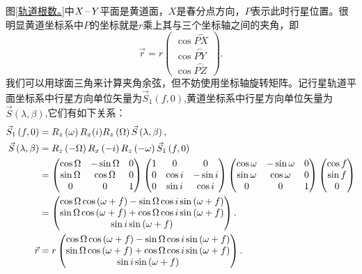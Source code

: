 \documentclass[11pt, a4paper, oneside]{ctexart}
\numberwithin{equation}{subsection}
\begin{document}
图\ref{轨道根数。}中$X\,\text{\textendash}\,Y$平面是黄道面，$X$是春分点方向，$P$表示此时行星位置。很明显黄道坐标系中$P$的坐标就是$r$乘上其与三个坐标轴之间的夹角，即
\begin{equation}
\vec{r}=r\begin{pmatrix}
\cos\overset{\frown}{PX}\\
\cos\overset{\frown}{PY}\\
\cos\overset{\frown}{PZ}
\end{pmatrix}.
\end{equation}
我们可以用球面三角来计算夹角余弦，但不妨使用坐标轴旋转矩阵。记行星轨道平面坐标系中行星方向单位矢量为$\vec{S}_{1}\left(f,0\right)$,黄道坐标系中行星方向单位矢量为$\vec{S}\left(\lambda,\beta\right)$,它们有如下关系：
\begin{align}
\vec{S}_{1}\left(f,0\right)&=R_{z}\left(\omega\right)R_{x}(i)R_{z}\left(\Omega\right)\vec{S}\left(\lambda,\beta\right),\\
\vec{S}\left(\lambda,\beta\right)&=R_{z}\left(-\Omega\right)R_{x}\left(-i\right)R_{z}\left(-\omega\right)\vec{S}_{1}\left(f,0\right)\notag\\
&=\begin{pmatrix}
\cos\Omega & -\sin\Omega & 0\\
\sin\Omega & \cos\Omega & 0\\
0 & 0 & 1
\end{pmatrix}
\begin{pmatrix}
1 & 0 & 0\\
0 & \cos i & -\sin i\\
0 & \sin i & \cos i
\end{pmatrix}
\begin{pmatrix}
\cos\omega & -\sin\omega & 0\\
\sin\omega & \cos\omega & 0\\
0 & 0 & 1
\end{pmatrix}
\begin{pmatrix}
\cos f\\
\sin f\\
0
\end{pmatrix}\notag\\
&=\begin{pmatrix}
\cos\Omega\cos\left(\omega+f\right)-\sin\Omega\cos i\sin\left(\omega+f\right)\\
\sin\Omega\cos\left(\omega+f\right)+\cos\Omega\cos i\sin\left(\omega+f\right)\\
\sin i\sin\left(\omega+f\right)
\end{pmatrix}.\\
\vec{r}&=r\begin{pmatrix}
\cos\Omega\cos\left(\omega+f\right)-\sin\Omega\cos i\sin\left(\omega+f\right)\\
\sin\Omega\cos\left(\omega+f\right)+\cos\Omega\cos i\sin\left(\omega+f\right)\\
\sin i\sin\left(\omega+f\right)
\end{pmatrix}.\label{4.0.11}
\end{align}
\end{document}

